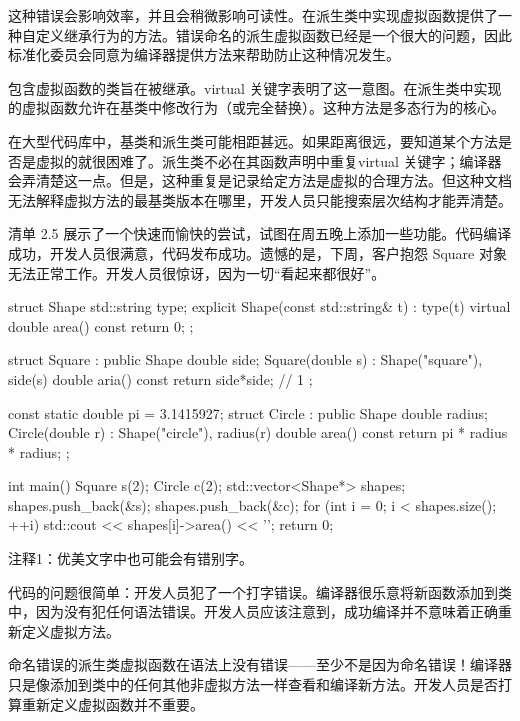 这种错误会影响效率，并且会稍微影响可读性。在派生类中实现虚拟函数提供了一种自定义继承行为的方法。错误命名的派生虚拟函数已经是一个很大的问题，因此标准化委员会同意为编译器提供方法来帮助防止这种情况发生。


包含虚拟函数的类旨在被继承。virtual 关键字表明了这一意图。在派生类中实现的虚拟函数允许在基类中修改行为（或完全替换）。这种方法是多态行为的核心。

在大型代码库中，基类和派生类可能相距甚远。如果距离很远，要知道某个方法是否是虚拟的就很困难了。派生类不必在其函数声明中重复virtual 关键字；编译器会弄清楚这一点。但是，这种重复是记录给定方法是虚拟的合理方法。但这种文档无法解释虚拟方法的最基类版本在哪里，开发人员只能搜索层次结构才能弄清楚。

清单 2.5 展示了一个快速而愉快的尝试，试图在周五晚上添加一些功能。代码编译成功，开发人员很满意，代码发布成功。遗憾的是，下周，客户抱怨 Square 对象无法正常工作。开发人员很惊讶，因为一切“看起来都很好”。


\begin{cpp}
struct Shape {
  std::string type;
  explicit Shape(const std::string& t) : type(t) {}
  virtual double area() const { return 0; }
};

struct Square : public Shape {
  double side;
  Square(double s) : Shape("square"), side(s) {}
  double aria() const { return side*side; } // 1
};

const static double pi = 3.1415927;
struct Circle : public Shape {
  double radius;
  Circle(double r) : Shape("circle"), radius(r) {}
  double area() const { return pi * radius * radius; }
};

int main() {
  Square s(2);
  Circle c(2);
  std::vector<Shape*> shapes;
  shapes.push_back(&s);
  shapes.push_back(&c);
  for (int i = 0; i < shapes.size(); ++i)
    std::cout << shapes[i]->area() << '\n';
  return 0;
}
\end{cpp}

{\footnotesize
注释1：优美文字中也可能会有错别字。
}


代码的问题很简单：开发人员犯了一个打字错误。编译器很乐意将新函数添加到类中，因为没有犯任何语法错误。开发人员应该注意到，成功编译并不意味着正确重新定义虚拟方法。

命名错误的派生类虚拟函数在语法上没有错误——至少不是因为命名错误！编译器只是像添加到类中的任何其他非虚拟方法一样查看和编译新方法。开发人员是否打算重新定义虚拟函数并不重要。

